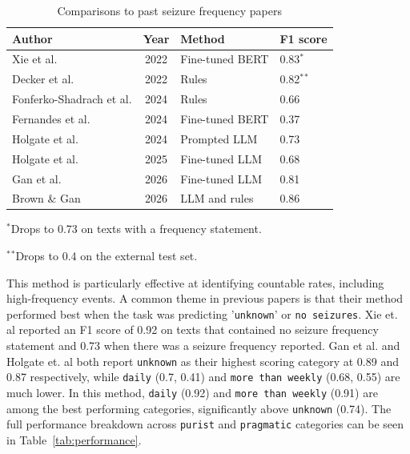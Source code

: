 \documentclass[conference]{IEEEtran}
\begin{document}
\begin{table}[!t]
\caption{Comparisons to past seizure frequency papers}
\label{tab:historical}
\centering
\begin{tabularx}{\linewidth}{Ycll}
\toprule
\textbf{Author} & \textbf{Year} & \textbf{Method} & \textbf{F1 score} \\
\midrule
Xie et al. & 2022 & Fine-tuned BERT & 0.83$^\ast$ \\
Decker et al. & 2022 & Rules & 0.82$^\ast$$^\ast$ \\
Fonferko-Shadrach et al. & 2024 & Rules & 0.66 \\
Fernandes et al. & 2024 & Fine-tuned BERT & 0.37 \\
Holgate et al. & 2024 & Prompted LLM & 0.73 \\
Holgate et al. & 2025 & Fine-tuned LLM & 0.68 \\
Gan et al. & 2026 & Fine-tuned LLM & 0.81 \\
\midrule
Brown \& Gan & 2026 & LLM and rules & 0.86 \\
\bottomrule
\end{tabularx}

\vspace*{2pt}
\begin{minipage}{\linewidth}
\raggedright\footnotesize
$^\ast$Drops to 0.73 on texts with a frequency statement.
\end{minipage}

\begin{minipage}{\linewidth}
\raggedright\footnotesize
$^\ast$$^\ast$Drops to 0.4 on the external test set. 
\end{minipage}
\end{table}

This method is particularly effective at identifying 
countable rates, including high-frequency events. A common theme in 
previous papers is that their method performed 
best when the task was predicting  '\texttt{unknown}' or  
\texttt{no seizures}. Xie et. al reported an F1 score of 0.92 on 
texts that contained no seizure frequency statement and 
0.73 when there was a seizure frequency reported. Gan 
et al. and Holgate et. al both report \texttt{unknown} as their 
highest scoring category at 0.89 and 0.87 respectively, 
while \texttt{daily} (0.7, 0.41) and \texttt{more than weekly} 
(0.68, 0.55) are much lower. In this method, \texttt{daily} (0.92) and 
\texttt{more than weekly} (0.91) are among the best performing 
categories, significantly above \texttt{unknown} (0.74). The full
performance breakdown across \texttt{purist} and \texttt{pragmatic} 
categories can be seen in Table~\ref{tab:performance}.
\end{document}
